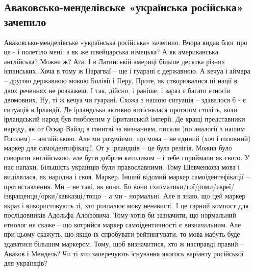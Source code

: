  
 
 
 
 

\subsection{Аваковсько-менделівське «українська російська» зачепило}

Аваковсько-менделівське «українська російська» зачепило.
Вчора видав блог про це - і полетіло мені: а як же швейцарська німецька? А як американська англійська? Можна ж?
Ага. І в Латинській америці більше десятка різних іспанських.
Хоча в тому ж Парагваї – ще і гуарані є державною. А кечуа і аймара – другою державною мовою Болівії і Перу.
Проте, як створювалися ці нації в двох реченнях не розкажеш.
І так, дійсно, і раніше, і зараз є багато етносів двомовних. Ну, ті ж кечуа чи гуарані.
Схожа з нашою ситуація – здавалося б - є ситуація в Ірландії.
Де ірландська активно витіснялася протягом століть, коли ірландський народ був гнобленим у Британській імперії.
Де кращі представники народу, як от Оскар Вайлд в гонитві за визнанням, писали (по аналогії з нашим Гоголем) – англійською.
Але ми розуміємо, що мова – не єдиний (хоч і головний) маркер для самоідентифікації.
От у ірландців – це була релігія. Можна було говорити англійською, але бути добрим католиком – і тебе сприймали як свого.
У нас напаки. Більшість українців були православними.
Тому Шевченкова мова і виділялася, як народна і своя. Маркер.
Інший відомий маркер самоідентефікації – протиставлення. Ми – не такі, як вони. Бо вони схизматики/гої/роми/євреї/ізвращенци/орки/кавказці/тощо – а ми - нормальні.
Але я знаю, що цей маркер якраз і використовують ті, хто розпалює мову ненависті. І це гарний компост для послідовників Адольфа Алоїзовича.
Тому хотів би зазначити, що нормальний етнолог не скаже – що котрийся маркер самоідентичності є визначальним. Але при цьому скажуть, що якщо їх спробувати рейтингувати, то мова мабуть буде здаватися більшим маркером.
Тому, щоб визначитися, хто ж насправді правий – Аваков і Мендель? Чи ті хто заперечують існування якогось варіанту російської для українців?
